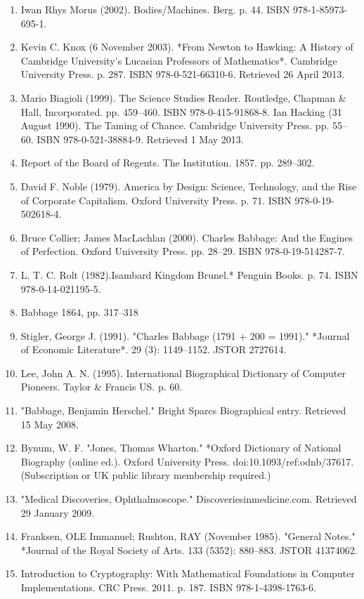 \begin{enumerate}
\item Iwan Rhys Morus (2002). Bodies/Machines. Berg. p. 44. ISBN 978-1-85973-695-1.  
\item Kevin C. Knox (6 November 2003). *From Newton to Hawking: A History of Cambridge University's Lucasian Professors of Mathematics*. Cambridge University Press. p. 287. ISBN 978-0-521-66310-6. Retrieved 26 April 2013.  
\item Mario Biagioli (1999). The Science Studies Reader. Routledge, Chapman & Hall, Incorporated. pp. 459–460. ISBN 978-0-415-91868-8.  
Ian Hacking (31 August 1990). The Taming of Chance. Cambridge University Press. pp. 55–60. ISBN 978-0-521-38884-9. Retrieved 1 May 2013.  
\item Report of the Board of Regents. The Institution. 1857. pp. 289–302.  
\item David F. Noble (1979). America by Design: Science, Technology, and the Rise of Corporate Capitalism. Oxford University Press. p. 71. ISBN 978-0-19-502618-4.  
\item Bruce Collier; James MacLachlan (2000). Charles Babbage: And the Engines of Perfection. Oxford University Press. pp. 28–29. ISBN 978-0-19-514287-7.
\item L. T. C. Rolt (1982).Isambard Kingdom Brunel.* Penguin Books. p. 74. ISBN 978-0-14-021195-5.  
\item Babbage 1864, pp. 317–318  
\item Stigler, George J. (1991). "Charles Babbage (1791 + 200 = 1991)." *Journal of Economic Literature*. 29 (3): 1149–1152. JSTOR 2727614.  
\item Lee, John A. N. (1995). International Biographical Dictionary of Computer Pioneers. Taylor & Francis US. p. 60.  
\item "Babbage, Benjamin Herschel." Bright Sparcs Biographical entry. Retrieved 15 May 2008.  
\item Bynum, W. F. "Jones, Thomas Wharton." *Oxford Dictionary of National Biography (online ed.). Oxford University Press. doi:10.1093/ref:odnb/37617. (Subscription or UK public library membership required.)  
\item "Medical Discoveries, Ophthalmoscope." Discoveriesinmedicine.com. Retrieved 29 January 2009.  
\item Franksen, OLE Immanuel; Rushton, RAY (November 1985). "General Notes." *Journal of the Royal Society of Arts. 133 (5352): 880–883. JSTOR 41374062.  
\item Introduction to Cryptography: With Mathematical Foundations in Computer Implementations. CRC Press. 2011. p. 187. ISBN 978-1-4398-1763-6.  

\end{enumerate}
